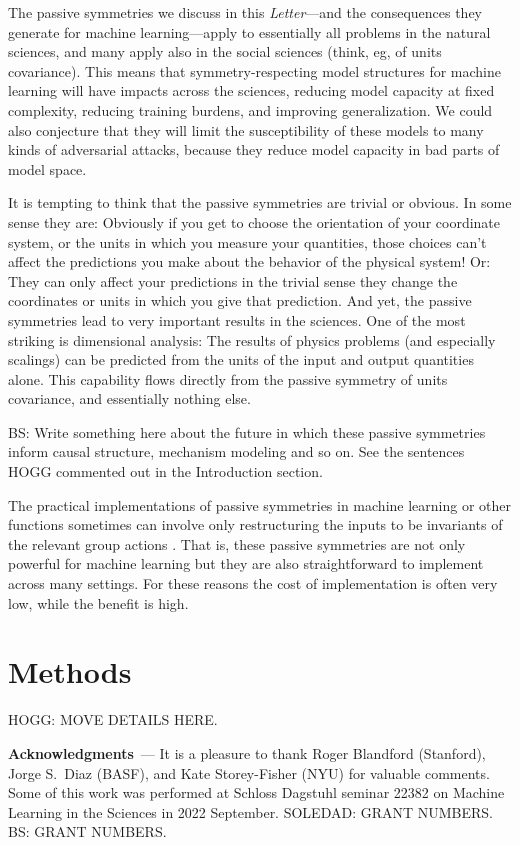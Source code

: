 \documentclass[11pt]{article}
\renewcommand{\paragraph}[1]{\medskip\par\noindent\textbf{#1}~---}
\newcommand{\documentname}{\textsl{Letter}}
\begin{document}
The passive symmetries we discuss in this \documentname{}---and the consequences they generate for machine learning---apply to essentially all problems in the natural sciences, and many apply also in the social sciences (think, eg, of units covariance).
This means that symmetry-respecting model structures for machine learning will have impacts across the sciences, reducing model capacity at fixed complexity, reducing training burdens, and improving generalization.
We could also conjecture that they will limit the susceptibility of these models to many kinds of adversarial attacks, because they reduce model capacity in bad parts of model space.

It is tempting to think that the passive symmetries are trivial or obvious.
In some sense they are: Obviously if you get to choose the orientation of your coordinate system, or the units in which you measure your quantities, those choices can't affect the predictions you make about the behavior of the physical system!
Or: They can only affect your predictions in the trivial sense they change the coordinates or units in which you give that prediction.
And yet, the passive symmetries lead to very important results in the sciences.
One of the most striking is dimensional analysis: The results of physics problems (and especially scalings) can be predicted from the units of the input and output quantities alone.
This capability flows directly from the passive symmetry of units covariance, and essentially nothing else.

BS: Write something here about the future in which these passive symmetries inform causal structure, mechanism modeling and so on. See the sentences HOGG commented out in the Introduction section.

The practical implementations of passive symmetries in machine learning or other functions sometimes can involve only restructuring the inputs to be invariants of the relevant group actions \cite{villar2021scalars, blum2022equivariant}.
That is, these passive symmetries are not only powerful for machine learning but they are also straightforward to implement across many settings.
For these reasons the cost of implementation is often very low, while the benefit is high.

\section*{Methods}

{\small
HOGG: MOVE DETAILS HERE.


}

\paragraph{Acknowledgments}
It is a pleasure to thank Roger Blandford (Stanford), Jorge S.~Diaz (BASF), and Kate Storey-Fisher (NYU) for valuable comments.
Some of this work was performed at Schloss Dagstuhl seminar 22382 on Machine Learning in the Sciences in 2022 September.
SOLEDAD: GRANT NUMBERS.
BS: GRANT NUMBERS.


\raggedright

\end{document}
